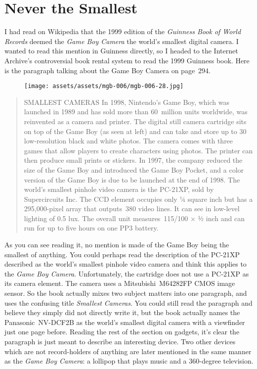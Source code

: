 \documentclass{book}
\begin{document}
\FloatBarrier\needspace{10mm}\section*{Never the Smallest}\nopagebreak[4]

I had read on Wikipedia that the 1999 edition of the \emph{Guinness Book of World Records} deemed the \emph{Game Boy Camera} the world’s smallest digital camera. I wanted to read this mention in Guinness directly, so I headed to the Internet Archive’s controversial book rental system to read the 1999 Guinness book. Here is the paragraph talking about the Game Boy Camera on page~294.

\begin{figure}[hbt]
\vskip 10pt
\centering \texttt{[image: assets/assets/mgb-006/mgb-006-28.jpg]}
\vskip 6pt
\end{figure}

\begin{quote}
SMALLEST CAMERAS In 1998, Nintendo’s Game Boy, which was launched in 1989 and has sold more than 60~million units worldwide, was reinvented as a camera and printer. The digital still camera cartridge sits on top of the Game Boy (as seen at left) and can take and store up to 30 low-resolution black and white photos. The camera comes with three games that allow players to create characters using photos. The printer can then produce small prints or stickers. In 1997, the company reduced the size of the Game Boy and introduced the Game Boy Pocket, and a color version of the Game Boy is due to be launched at the end of 1998. The world’s smallest pinhole video camera is the PC-21XP, sold by Supercircuits Inc. The CCD element occupies only ¼ square inch but has a 295,000-pixel array that outputs~380 video lines. It can see in low-level lighting of 0.5 lux. The overall unit measures~115/100 × ½ inch and can run for up to five hours on one PP3 battery.
\end{quote} \par

As you can see reading it, no mention is made of the Game Boy being the smallest of anything. You could perhaps read the description of the PC-21XP described as the world’s smallest pinhole video camera and think this applies to the \emph{Game Boy Camera}. Unfortunately, the cartridge does not use a PC-21XP as its camera element. The camera uses a Mitsubishi~M64282FP CMOS image sensor. So the book actually mixes two subject matters into one paragraph, and uses the confusing title \emph{Smallest Cameras}. You could still read the paragraph and believe they simply did not directly write it, but the book actually names the Panasonic~NV-DCF2B as the world’s smallest digital camera with a viewfinder just one page before. Reading the rest of the section on gadgets, it’s clear the paragraph is just meant to describe an interesting device. Two other devices which are not record-holders of anything are later mentioned in the same manner as the \emph{Game Boy Camera}: a lollipop that plays music and a 360-degree television.
\end{document}
